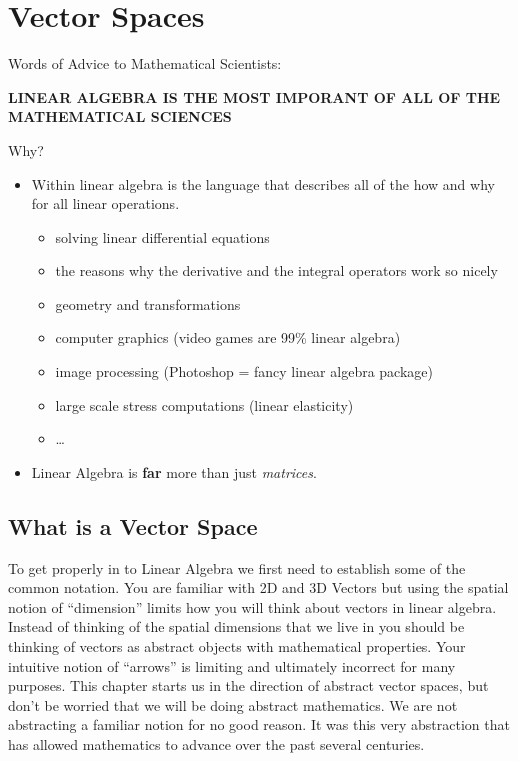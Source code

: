 \chapter{Vector Spaces}

Words of Advice to Mathematical Scientists:\\
\begin{center}
    {\bf LINEAR ALGEBRA IS THE MOST IMPORANT OF ALL OF THE MATHEMATICAL SCIENCES}
\end{center}
Why?
\begin{itemize}
    \item Within linear algebra is the language that describes all of the how and why
        for all linear operations.
        \begin{itemize}
            \item solving linear differential equations
            \item the reasons why the derivative and the integral operators work so nicely
            \item geometry and transformations
            \item computer graphics (video games are 99\% linear algebra)
            \item image processing (Photoshop = fancy linear algebra package)
            \item large scale stress computations (linear elasticity)
            \item \dots
        \end{itemize}
    \item Linear Algebra is {\bf far} more than just {\it matrices}.
\end{itemize}

\section{What is a Vector Space}

To get properly in to Linear Algebra we first need to establish some of the common
notation.  You are familiar with 2D and 3D Vectors but using the spatial notion of
``dimension'' limits how you will think about vectors in linear algebra.  Instead of
thinking of the spatial dimensions that we live in you should be thinking of vectors as
abstract objects with mathematical properties.  Your intuitive notion of ``arrows'' is
limiting and ultimately incorrect for many purposes.  This chapter starts us in the direction of abstract
vector spaces, but don't be worried that we will be doing abstract mathematics.  We are
not abstracting a familiar notion for no good reason.  It was this very abstraction that
has allowed mathematics to advance over the past several centuries.

